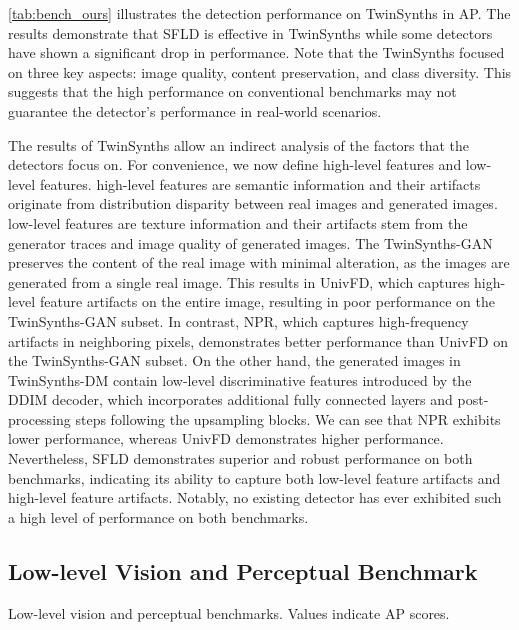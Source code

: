 \cref{tab:bench_ours} illustrates the detection performance on TwinSynths in AP.
The results demonstrate that SFLD is effective in TwinSynths while some detectors have shown a significant drop in performance.
Note that the TwinSynths focused on three key aspects: image quality, content preservation, and class diversity.
This suggests that the high performance on conventional benchmarks may not guarantee the detector's performance in real-world scenarios.

The results of TwinSynths allow an indirect analysis of the factors that the detectors focus on.
For convenience, we now define high-level features and low-level features.
high-level features are semantic information and their artifacts originate from distribution disparity between real images and generated images.
low-level features are texture information and their artifacts stem from the generator traces and image quality of generated images.
The TwinSynths-GAN preserves the content of the real image with minimal alteration, as the images are generated from a single real image.
This results in UnivFD, which captures high-level feature artifacts on the entire image, resulting in poor performance on the TwinSynths-GAN subset.
In contrast, NPR, which captures high-frequency artifacts in neighboring pixels, demonstrates better performance than UnivFD on the TwinSynths-GAN subset.
On the other hand, the generated images in TwinSynths-DM contain low-level discriminative features introduced by the DDIM decoder, which incorporates additional fully connected layers and post-processing steps following the upsampling blocks.
We can see that NPR exhibits lower performance, whereas UnivFD demonstrates higher performance.
Nevertheless, SFLD demonstrates superior and robust performance on both benchmarks, indicating its ability to capture both low-level feature artifacts and high-level feature artifacts.
Notably, no existing detector has ever exhibited such a high level of performance on both benchmarks.


\subsection{Low-level Vision and Perceptual Benchmark}
\label{sec:experiments_lowlevel}

\begin{table}[t]
    \centering
    \resizebox{0.8\linewidth}{!}{
        
    }
    \caption{Low-level vision and perceptual benchmarks. Values indicate AP scores.}
    \label{tab:low-level-vision-tasks}
\end{table}

